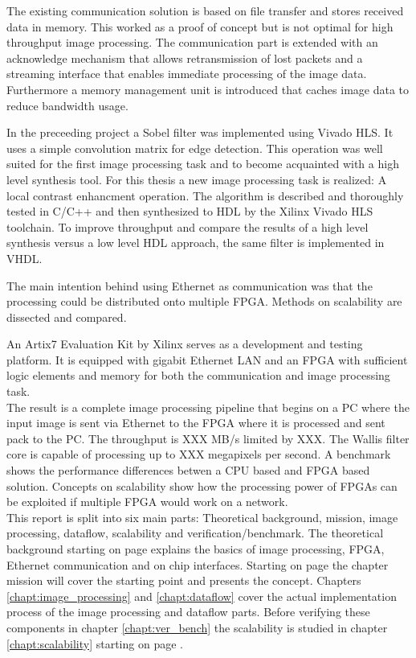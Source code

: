 The existing communication solution is based on file transfer and stores
received data in memory. This worked as a proof of concept but is not optimal
for high throughput image processing. The communication part is extended with an
acknowledge mechanism that allows retransmission of lost packets and a streaming
interface that enables immediate processing of the image data. Furthermore a
memory management unit is introduced that caches image data to reduce bandwidth
usage.

In the preceeding project a Sobel filter was implemented using Vivado HLS. It
uses a simple convolution matrix for edge detection. This operation was well
suited for the first image processing task and to become acquainted with a high
level synthesis tool. For this thesis a new image processing task is realized: A
local contrast enhancment operation. The algorithm is described and thoroughly
tested in C/C++ and then synthesized to HDL by the Xilinx Vivado HLS toolchain.
To improve throughput and compare the results of a high level synthesis versus a
low level HDL approach, the same filter is implemented in VHDL.

The main intention behind using Ethernet as communication was that the
processing could be distributed onto multiple FPGA. Methods on scalability are
dissected and compared.

An Artix7 Evaluation Kit by Xilinx serves as a development and testing platform.
It is equipped with gigabit Ethernet LAN and an FPGA with sufficient logic
elements and memory for both the communication and image processing task.
\\

The result is a complete image processing pipeline that begins on a PC where the
input image is sent via Ethernet to the FPGA where it is processed and sent pack
to the PC. The throughput is XXX MB/s limited by XXX. The Wallis filter core
is capable of processing up to XXX megapixels per second. A benchmark shows the
performance differences betwen a CPU based and FPGA based solution. Concepts on
scalability show how the processing power of FPGAs can be exploited if multiple
FPGA would work on a network.
\\

This report is split into six main parts: Theoretical background, mission,
image processing, dataflow, scalability and verification/benchmark.  The
theoretical background starting on page \pageref{chapt:theoreticalback} explains
the basics of image processing, FPGA, Ethernet communication and on chip
interfaces. Starting on page \pageref{chapt:mission} the chapter mission will
cover the starting point and presents the concept. Chapters 
\ref{chapt:image_processing} and \ref{chapt:dataflow} cover the actual
implementation process of the image processing and dataflow parts.
Before verifying these components in chapter \ref{chapt:ver_bench} the
scalability is studied in chapter \ref{chapt:scalability} starting on page
\pageref{chapt:scalability}.

